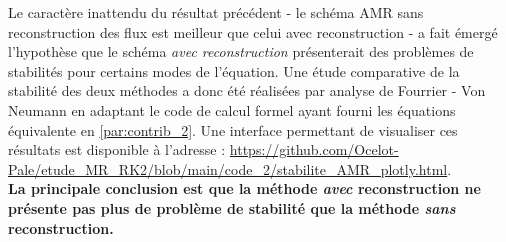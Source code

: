 \label{par:stab_amr}
Le caractère inattendu du résultat précédent - le schéma AMR sans reconstruction des flux est meilleur que celui avec reconstruction - a fait émergé l'hypothèse 
que le schéma \textit{avec reconstruction} présenterait des problèmes de stabilités pour certains modes de l'équation.
Une étude comparative de la stabilité des deux méthodes a donc été réalisées par analyse de Fourrier - Von Neumann en adaptant le code de calcul formel ayant fourni les équations équivalente en \ref{par:contrib_2}.
Une interface permettant de visualiser ces résultats est disponible à l'adresse : \href{https://github.com/Ocelot-Pale/etude\_MR\_RK2/blob/main/code\_2/stabilite\_AMR\_plotly.html}{https://github.com/Ocelot-Pale/etude\_MR\_RK2/blob/main/code\_2/stabilite\_AMR\_plotly.html}.\\
\textbf{La principale conclusion est que la méthode \textit{avec} reconstruction ne présente pas plus de problème de stabilité que la méthode \textit{sans} reconstruction.}
